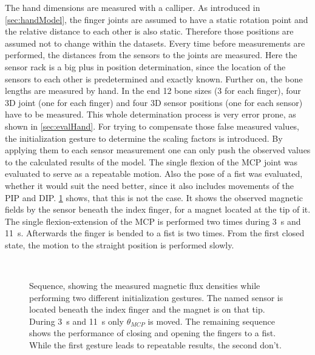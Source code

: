 The hand dimensions are measured with a calliper. As introduced in \ref{sec:handModel}, the finger joints are assumed to have a static rotation point and the relative distance to each other is also static. Therefore those positions are assumed not to change within the datasets. Every time before measurements are performed, the distances from the sensors to the joints are measured. Here the sensor rack is a big plus in position determination, since the location of the sensors to each other is predetermined and exactly known. Further on, the bone lengths are measured by hand. In the end 12 bone sizes (3 for each finger), four 3D joint (one for each finger) and four 3D sensor positions (one for each sensor) have to be measured. This whole determination process is very error prone, as shown in \ref{sec:evalHand}. For trying to compensate those false measured values, the initialization gesture to determine the scaling factors is introduced. By applying them to each sensor measurement one can only push the observed values to the calculated results of the model. The single flexion of the \ac{MCP} joint was evaluated to serve as a repeatable motion. Also the pose of a fist was evaluated, whether it would suit the need better, since it also includes movements of the \ac{PIP} and \ac{DIP}. \ref{fig:set1mag} shows, that this is not the case. It shows the observed magnetic fields by the sensor beneath the index finger, for a magnet located at the tip of it. The single flexion-extension of the \ac{MCP} is performed two times during \SI{3}{\second} and \SI{11}{\second}. Afterwards the finger is bended to a fist is two times. From the first closed state, the motion to the straight position is performed slowly.\\
\begin{figure}[!htb]
\centering
{}\\
\caption[Measured magnetic flux densities for various initialization gestures]
{Sequence, showing the measured magnetic flux densities while performing two different initialization gestures. The named sensor is located beneath the index finger and the magnet is on that tip. During \SI{3}{\second} and \SI{11}{\second} only $ \theta_{MCP} $ is moved. The remaining sequence shows the performance of closing and opening the fingers to a fist. While the first gesture leads to repeatable results, the second don't.}
\label{fig:set1mag}
\end{figure}

